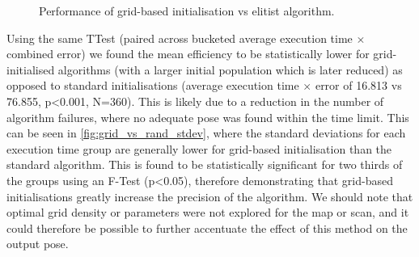 \documentclass[authoryearcitations]{UoYCSproject}
\begin{document}
\begin{figure}
	\centering
	\caption{Performance of grid-based initialisation vs elitist algorithm.}
	\label{fig:grid_vs_elit}
\end{figure}

Using the same TTest (paired across bucketed average execution time $\times$ combined error) we found the mean efficiency to be statistically lower for grid-initialised algorithms (with a larger initial population which is later reduced) as opposed to standard initialisations (average execution time $\times$ error of 16.813 vs 76.855, p<0.001, N=360). This is likely due to a reduction in the number of algorithm failures, where no adequate pose was found within the time limit. This can be seen in \autoref{fig:grid_vs_rand_stdev}, where the standard deviations for each execution time group are generally lower for grid-based initialisation than the standard algorithm. This is found to be statistically significant for two thirds of the groups using an F-Test (p<0.05), therefore demonstrating that grid-based initialisations greatly increase the precision of the algorithm. We should note that optimal grid density or parameters were not explored for the map or scan, and it could therefore be possible to further accentuate the effect of this method on the output pose.
\end{document}
